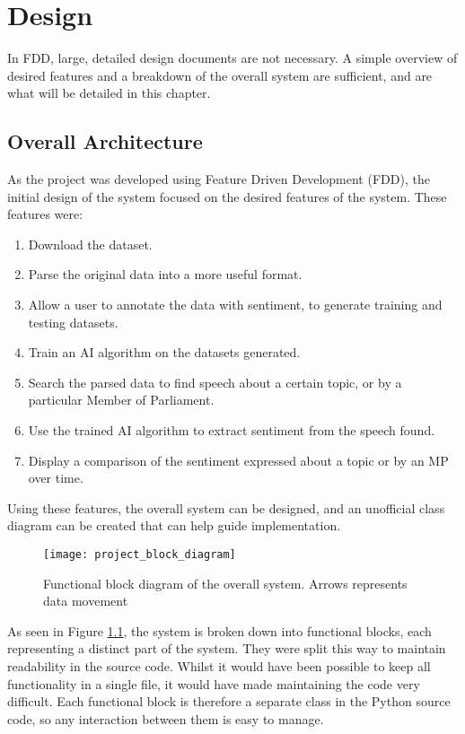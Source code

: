 \chapter{Design}

In FDD, large, detailed design documents are not necessary. A simple overview of desired features and a breakdown of the overall system are sufficient, and are what will be detailed in this chapter.

\section{Overall Architecture}
\label{sec:des_Architecture}
As the project was developed using Feature Driven Development (FDD), the initial design of the system focused on the desired features of the system. These features were:
\begin{enumerate} %
	\item Download the dataset.
	\item Parse the original data into a more useful format.
	\item Allow a user to annotate the data with sentiment, to generate training and testing datasets.
	\item Train an AI algorithm on the datasets generated.
	\item Search the parsed data to find speech about a certain topic, or by a particular Member of Parliament.
	\item Use the trained AI algorithm to extract sentiment from the speech found.
	\item Display a comparison of the sentiment expressed about a topic or by an MP over time.
\end{enumerate}

Using these features, the overall system can be designed, and an unofficial class diagram can be created that can help guide implementation.

\begin{figure}[ht]
	\texttt{[image: project\_block\_diagram]}
	\caption{Functional block diagram of the overall system. Arrows represents data movement}
	\label{fig:project_block_diagram}
\end{figure}

As seen in Figure \ref{fig:project_block_diagram}, the system is broken down into functional blocks, each representing a distinct part of the system. They were split this way to maintain readability in the source code. Whilst it would have been possible to keep all functionality in a single file, it would have made maintaining the code very difficult. Each functional block is therefore a separate class in the Python source code, so any interaction between them is easy to manage.

